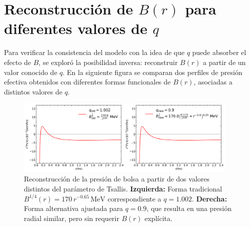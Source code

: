 \section{Reconstrucci\'on de \( B(r) \) para diferentes valores de \( q \)}

Para verificar la consistencia del modelo con la idea de que \( q \) puede absorber el efecto de \( B \), se explor\'o la posibilidad inversa: reconstruir \( B(r) \) a partir de un valor conocido de \( q \). En la siguiente figura se comparan dos perfiles de presi\'on efectiva obtenidos con diferentes formas funcionales de \( B(r) \), asociadas a distintos valores de \( q \).

\begin{figure}[H]
    \centering
    \includegraphics[width=0.95\textwidth]{./Images/Comparacion_B_old_new_dual.png}
    \caption[Reconstrucci\'on de \( B(r) \) para diferentes \( q \)]{Reconstrucci\'on de la presi\'on de bolsa a partir de dos valores distintos del par\'ametro de Tsallis. \textbf{Izquierda:} Forma tradicional \( B^{1/4}(r) = 170\,r^{-0.65} \,\mathrm{MeV} \) correspondiente a \( q = 1.002 \). \textbf{Derecha:} Forma alternativa ajustada para \( q = 0.9 \), que resulta en una presi\'on radial similar, pero sin requerir \( B(r) \) expl\'icita.}
    \label{fig:B_reconstructed_dual}
\end{figure}

